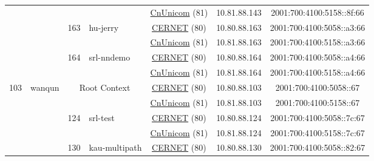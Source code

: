 \begin{small}
\begin{center}
\begin{longtable}{|c|c|c|c|c|c|c|c|}
  &  &  &  & \multicolumn{2}{|c|}{\tiny{\href{http://www.chinaunicom.com}{CnUnicom} (81)}} & \tiny{10.81.88.143} & \tiny{2001:700:4100:5158::8f:66} \\* \cline{3-3}\cline{4-4}\cline{5-5}\cline{6-6}\cline{7-7}\cline{8-8}
  &  & \multirow{2}{*}{\tiny{163}} & \multicolumn{1}{|l|}{\multirow{2}{*}{\tiny{hu-jerry}}} & \multicolumn{2}{|c|}{\tiny{\href{http://www.cernet.edu.cn}{CERNET} (80)}} & \tiny{10.80.88.163} & \tiny{2001:700:4100:5058::a3:66} \\* \cline{5-5}\cline{6-6}\cline{7-7}\cline{8-8}
  &  &  &  & \multicolumn{2}{|c|}{\tiny{\href{http://www.chinaunicom.com}{CnUnicom} (81)}} & \tiny{10.81.88.163} & \tiny{2001:700:4100:5158::a3:66} \\* \cline{3-3}\cline{4-4}\cline{5-5}\cline{6-6}\cline{7-7}\cline{8-8}
  &  & \multirow{2}{*}{\tiny{164}} & \multicolumn{1}{|l|}{\multirow{2}{*}{\tiny{srl-nndemo}}} & \multicolumn{2}{|c|}{\tiny{\href{http://www.cernet.edu.cn}{CERNET} (80)}} & \tiny{10.80.88.164} & \tiny{2001:700:4100:5058::a4:66} \\* \cline{5-5}\cline{6-6}\cline{7-7}\cline{8-8}
  &  &  &  & \multicolumn{2}{|c|}{\tiny{\href{http://www.chinaunicom.com}{CnUnicom} (81)}} & \tiny{10.81.88.164} & \tiny{2001:700:4100:5158::a4:66} \\ \hline
 \multirow{14}{*}{\tiny{103}} & \multicolumn{1}{|l|}{\multirow{14}{*}{\tiny{wanqun}}} & \multicolumn{2}{|c|}{\multirow{2}{*}{\tiny{Root Context}}} & \multicolumn{2}{|c|}{\tiny{\href{http://www.cernet.edu.cn}{CERNET} (80)}} & \tiny{10.80.88.103} & \tiny{2001:700:4100:5058::67} \\* \cline{5-5}\cline{6-6}\cline{7-7}\cline{8-8}
  &  & \multicolumn{2}{|c|}{} & \multicolumn{2}{|c|}{\tiny{\href{http://www.chinaunicom.com}{CnUnicom} (81)}} & \tiny{10.81.88.103} & \tiny{2001:700:4100:5158::67} \\* \cline{3-3}\cline{4-4}\cline{5-5}\cline{6-6}\cline{7-7}\cline{8-8}
  &  & \multirow{2}{*}{\tiny{124}} & \multicolumn{1}{|l|}{\multirow{2}{*}{\tiny{srl-test}}} & \multicolumn{2}{|c|}{\tiny{\href{http://www.cernet.edu.cn}{CERNET} (80)}} & \tiny{10.80.88.124} & \tiny{2001:700:4100:5058::7c:67} \\* \cline{5-5}\cline{6-6}\cline{7-7}\cline{8-8}
  &  &  &  & \multicolumn{2}{|c|}{\tiny{\href{http://www.chinaunicom.com}{CnUnicom} (81)}} & \tiny{10.81.88.124} & \tiny{2001:700:4100:5158::7c:67} \\* \cline{3-3}\cline{4-4}\cline{5-5}\cline{6-6}\cline{7-7}\cline{8-8}
  &  & \multirow{2}{*}{\tiny{130}} & \multicolumn{1}{|l|}{\multirow{2}{*}{\tiny{kau-multipath}}} & \multicolumn{2}{|c|}{\tiny{\href{http://www.cernet.edu.cn}{CERNET} (80)}} & \tiny{10.80.88.130} & \tiny{2001:700:4100:5058::82:67} \\* \cline{5-5}\cline{6-6}\cline{7-7}\cline{8-8}

\end{longtable}
\end{center}
\end{small}
